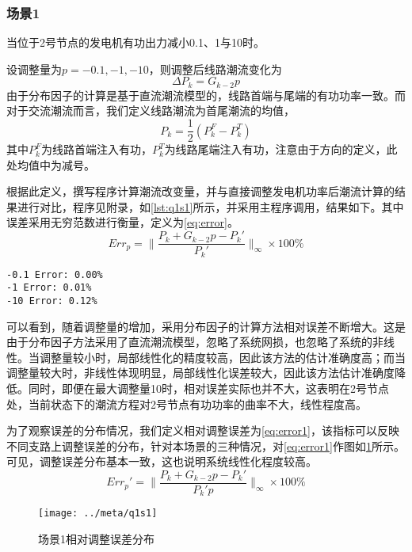 \documentclass[a4paper,12pt]{article}
\begin{document}
    \subsubsection{场景1} 当位于2号节点的发电机有功出力减小0.1、1与10时。

    设调整量为$p=-0.1,-1,-10$，则调整后线路潮流变化为
    \begin{equation}
      \Delta P_k = G_{k-2}p
    \end{equation}
    由于分布因子的计算是基于直流潮流模型的，线路首端与尾端的有功功率一致。而对于交流潮流而言，我们定义线路潮流为首尾潮流的均值，
    \begin{equation}
      P_k = \frac{1}{2}(P_k^F-P_k^T)
    \end{equation}
    其中$P_k^F$为线路首端注入有功，$P_k^T$为线路尾端注入有功，注意由于方向的定义，此处均值中为减号。

    根据此定义，撰写程序计算潮流改变量，并与直接调整发电机功率后潮流计算的结果进行对比，程序见附录，如\cref{lst:q1s1}所示，并采用主程序调用，结果如下。其中误差采用无穷范数进行衡量，定义为\cref{eq:error}。
    \begin{equation}
      \label{eq:error}
      Err_p = \parallel\frac{P_k + G_{k-2}p - P_k'}{P_k'}\parallel_\infty \times 100\%
    \end{equation}
    \begin{lstlisting}[style=Matlab-editor,basicstyle=\mlttfamily]
-0.1 Error: 0.00%
-1 Error: 0.01%
-10 Error: 0.12%
    \end{lstlisting}

    可以看到，随着调整量的增加，采用分布因子的计算方法相对误差不断增大。这是由于分布因子方法采用了直流潮流模型，忽略了系统网损，也忽略了系统的非线性。当调整量较小时，局部线性化的精度较高，因此该方法的估计准确度高；而当调整量较大时，非线性体现明显，局部线性化误差较大，因此该方法估计准确度降低。同时，即便在最大调整量10时，相对误差实际也并不大，这表明在2号节点处，当前状态下的潮流方程对2号节点有功功率的曲率不大，线性程度高。

    为了观察误差的分布情况，我们定义相对调整误差为\cref{eq:error1}，该指标可以反映不同支路上调整误差的分布，针对本场景的三种情况，对\cref{eq:error1}作图如\cref{fig:q1s1}所示。可见，调整误差分布基本一致，这也说明系统线性化程度较高。
    \begin{equation}
      \label{eq:error1}
      Err_p' = \parallel\frac{P_k + G_{k-2}p - P_k'}{P_k'p}\parallel_\infty \times 100\%
    \end{equation}
    \begin{figure}[htbp]
      \texttt{[image: ../meta/q1s1]}
      \caption{场景1相对调整误差分布}
      \label{fig:q1s1}
    \end{figure}
\end{document}
